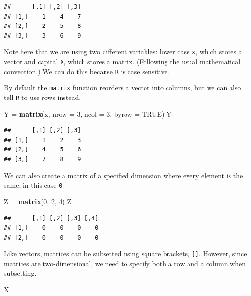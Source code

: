 \documentclass[]{book}
\newenvironment{Shaded}{\begin{snugshade}}{\end{snugshade}}
\newcommand{\KeywordTok}[1]{\textcolor[rgb]{0.13,0.29,0.53}{\textbf{#1}}}
\newcommand{\DataTypeTok}[1]{\textcolor[rgb]{0.13,0.29,0.53}{#1}}
\newcommand{\DecValTok}[1]{\textcolor[rgb]{0.00,0.00,0.81}{#1}}
\newcommand{\StringTok}[1]{\textcolor[rgb]{0.31,0.60,0.02}{#1}}
\newcommand{\OtherTok}[1]{\textcolor[rgb]{0.56,0.35,0.01}{#1}}
\newcommand{\NormalTok}[1]{#1}
\theoremstyle{definition}
\theoremstyle{definition}
\theoremstyle{definition}
\theoremstyle{remark}
\begin{document}
\begin{verbatim}
##      [,1] [,2] [,3]
## [1,]    1    4    7
## [2,]    2    5    8
## [3,]    3    6    9
\end{verbatim}

Note here that we are using two different variables: lower case
\texttt{x}, which stores a vector and capital \texttt{X}, which stores a
matrix. (Following the usual mathematical convention.) We can do this
because \texttt{R} is case sensitive.

By default the \texttt{matrix} function reorders a vector into columns,
but we can also tell \texttt{R} to use rows instead.

\begin{Shaded}
\begin{Highlighting}[]
\NormalTok{Y =}\StringTok{ }\KeywordTok{matrix}\NormalTok{(x, }\DataTypeTok{nrow =} \DecValTok{3}\NormalTok{, }\DataTypeTok{ncol =} \DecValTok{3}\NormalTok{, }\DataTypeTok{byrow =} \OtherTok{TRUE}\NormalTok{)}
\NormalTok{Y}
\end{Highlighting}
\end{Shaded}

\begin{verbatim}
##      [,1] [,2] [,3]
## [1,]    1    2    3
## [2,]    4    5    6
## [3,]    7    8    9
\end{verbatim}

We can also create a matrix of a specified dimension where every element
is the same, in this case \texttt{0}.

\begin{Shaded}
\begin{Highlighting}[]
\NormalTok{Z =}\StringTok{ }\KeywordTok{matrix}\NormalTok{(}\DecValTok{0}\NormalTok{, }\DecValTok{2}\NormalTok{, }\DecValTok{4}\NormalTok{)}
\NormalTok{Z}
\end{Highlighting}
\end{Shaded}

\begin{verbatim}
##      [,1] [,2] [,3] [,4]
## [1,]    0    0    0    0
## [2,]    0    0    0    0
\end{verbatim}

Like vectors, matrices can be subsetted using square brackets,
\texttt{{[}{]}}. However, since matrices are two-dimensional, we need to
specify both a row and a column when subsetting.

\begin{Shaded}
\begin{Highlighting}[]
\NormalTok{X}
\end{Highlighting}
\end{Shaded}
\end{document}
